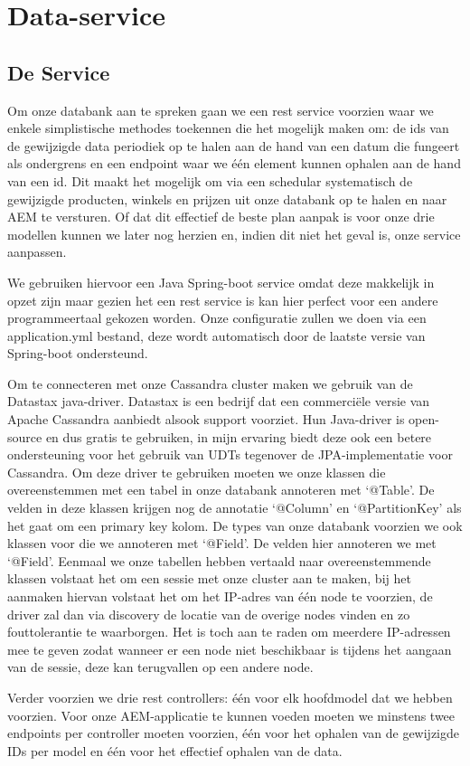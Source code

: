 \documentclass{article}
\begin{document}
	\section{Data-service}
	
	\subsection{De Service}
	Om onze databank aan te spreken gaan we een rest service voorzien waar we enkele simplistische methodes toekennen die het mogelijk maken om: de ids van de gewijzigde data periodiek op te halen aan de hand van een datum die fungeert als ondergrens en een endpoint waar we één element kunnen ophalen aan de hand van een id. Dit maakt het mogelijk om via een schedular systematisch de gewijzigde producten, winkels en prijzen uit onze databank op te halen en naar AEM te versturen. Of dat dit effectief de beste plan aanpak is voor onze drie modellen kunnen we later nog herzien en, indien dit niet het geval is, onze service aanpassen.
	\par
We gebruiken hiervoor een Java Spring-boot service omdat deze makkelijk in opzet zijn maar gezien het een rest service is kan hier perfect voor een andere programmeertaal gekozen worden. Onze configuratie zullen we doen via een application.yml bestand, deze wordt automatisch door de laatste versie van Spring-boot ondersteund.
\par
Om te connecteren met onze Cassandra cluster maken we gebruik van de Datastax java-driver. Datastax is een bedrijf dat een commerciële versie van Apache Cassandra aanbiedt alsook support voorziet. Hun Java-driver is open-source en dus gratis te gebruiken, in mijn ervaring biedt deze ook een betere ondersteuning voor het gebruik van UDTs tegenover de JPA-implementatie voor Cassandra. Om deze driver te gebruiken moeten we onze klassen die overeenstemmen met een tabel in onze databank annoteren met ‘@Table’. De velden in deze klassen krijgen nog de annotatie ‘@Column’ en ‘@PartitionKey’ als het gaat om een primary key kolom. De types van onze databank voorzien we ook klassen voor die we annoteren met ‘@Field’. De velden hier annoteren we met ‘@Field’. Eenmaal we onze tabellen hebben vertaald naar overeenstemmende klassen volstaat het om een sessie met onze cluster aan te maken, bij het aanmaken hiervan volstaat het om het IP-adres van één node te voorzien, de driver zal dan via discovery de locatie van de overige nodes vinden en zo fouttolerantie te waarborgen. Het is toch aan te raden om meerdere IP-adressen mee te geven zodat wanneer er een node niet beschikbaar is tijdens het aangaan van de sessie, deze kan terugvallen op een andere node.
\par
Verder voorzien we drie rest controllers: één voor elk hoofdmodel dat we hebben voorzien. Voor onze AEM-applicatie te kunnen voeden moeten we minstens twee endpoints per controller moeten voorzien, één voor het ophalen van de gewijzigde IDs per model en één voor het effectief ophalen van de data. 
\end{document}
